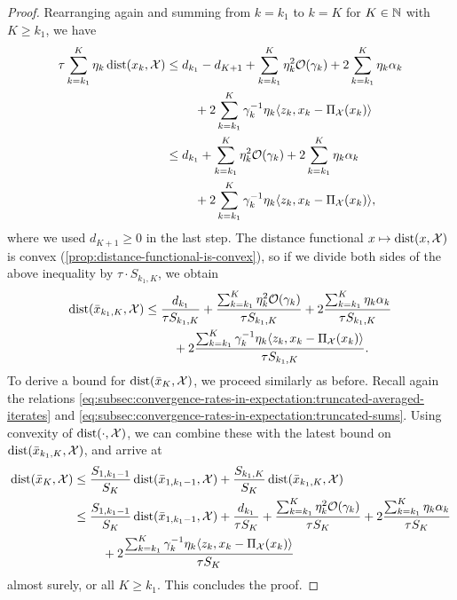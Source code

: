 \begin{proof}
    Rearranging again and summing from $k=k_1$ to $k=K$ for $K\in\mathbb{N}$ with $K \geq k_1$, we have
    \begin{align*}
        \tau \sum_{k=k_1}^{K} \eta_k \operatorname{dist}(x_k, \mathcal{X})
        &\leq
        d_{k_1} - d_{K+1} + \sum_{k=k_1}^{K} \eta_k^2 \mathcal{O}(\gamma_k)
            + 2 \sum_{k=k_1}^{K}\eta_k\alpha_k \\
        &\phantom{===} + 2\sum_{k=k_1}^K \gamma_k^{-1}\eta_k \langle z_k, x_k - \operatorname{\Pi_\mathcal{X}}(x_k) \rangle \\
        &\leq
        d_{k_1} + \sum_{k=k_1}^{K} \eta_k^2\mathcal{O}(\gamma_k)
            + 2 \sum_{k=k_1}^{K}\eta_k\alpha_k \\
        &\phantom{===} + 2\sum_{k=k_1}^K \gamma_k^{-1}\eta_k \langle z_k, x_k - \operatorname{\Pi_\mathcal{X}}(x_k) \rangle,
    \end{align*}
    where we used $d_{K+1} \geq 0$ in the last step.
    The distance functional $x\mapsto\operatorname{dist}(x,\mathcal{X})$
    is convex (\cref{prop:distance-functional-is-convex}), so if we divide both sides of
    the above inequality by $\tau \cdot S_{k_1, K}$, we obtain
    \begin{align*}
        \operatorname{dist}(\bar{x}_{k_1, K}, \mathcal{X})
        &\leq
        \frac{d_{k_1}}{\tau S_{k_1, K}} + \frac{\sum_{k=k_1}^{K} \eta_k^2 \mathcal{O}(\gamma_k)}{\tau S_{k_1, K}}
            + 2 \frac{\sum_{k=k_1}^{K}\eta_k\alpha_k}{\tau S_{k_1, K}} \\
        &\phantom{===} + 2 \frac{\sum_{k=k_1}^K \gamma_k^{-1}\eta_k \langle z_k, x_k - \operatorname{\Pi_\mathcal{X}}(x_k) \rangle}{\tau S_{k_1, K}}.
    \end{align*} 
    To derive a bound for $\operatorname{dist}(\bar{x}_K, \mathcal{X})$, we proceed similarly as before.
    Recall again the relations \eqref{eq:subsec:convergence-rates-in-expectation:truncated-averaged-iterates} and
    \eqref{eq:subsec:convergence-rates-in-expectation:truncated-sums}.
    Using convexity of $\operatorname{dist}(\cdot,\mathcal{X})$, we can combine these with the latest bound on $\operatorname{dist}(\bar{x}_{k_1, K}, \mathcal{X})$,
    and arrive at
    \begin{align*}
        \operatorname{dist}(\bar{x}_K, \mathcal{X})
        &\leq
        \frac{S_{1, k_1-1}}{S_K} \operatorname{dist}(\bar{x}_{1, k_1-1}, \mathcal{X})
            + \frac{S_{k_1, K}}{S_K} \operatorname{dist}(\bar{x}_{k_1, K}, \mathcal{X}) \\
        &\leq
        \frac{S_{1, k_1-1}}{S_K} \operatorname{dist}(\bar{x}_{1, k_1-1}, \mathcal{X})
            + \frac{d_{k_1}}{\tau S_K}
            + \frac{\sum_{k=k_1}^{K} \eta_k^2\mathcal{O}(\gamma_k)}{\tau S_K}
            + 2 \frac{\sum_{k=k_1}^{K}\eta_k\alpha_k}{\tau S_K} \\
        &\phantom{===} + 2 \frac{\sum_{k=k_1}^K \gamma_k^{-1}\eta_k \langle z_k, x_k - \operatorname{\Pi_\mathcal{X}}(x_k) \rangle}{\tau S_K}
    \end{align*}
    almost surely, or all $K \geq k_1$.
    This concludes the proof.
\end{proof}


